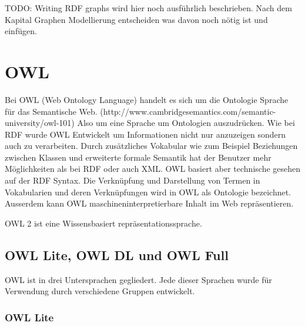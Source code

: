 TODO: Writing RDF graphs wird hier noch ausführlich beschrieben. Nach dem Kapital Graphen Modellierung entscheiden was davon noch nötig ist und einfügen.

\section{OWL}
\label{sec:owlRdf_owl}

Bei OWL (Web Ontology Language) handelt es sich um die Ontologie Sprache für das Semantische Web. (http://www.cambridgesemantics.com/semantic-university/owl-101) Also um eine Sprache um Ontologien auszudrücken. Wie bei RDF wurde OWL Entwickelt um Informationen nicht nur anzuzeigen sondern auch zu verarbeiten. Durch zusätzliches Vokabular wie zum Beispiel Beziehungen zwischen Klassen und erweiterte formale Semantik hat der Benutzer mehr Möglichkeiten als bei RDF oder auch XML. OWL basiert aber technische gesehen auf der RDF Syntax. Die Verknüpfung und Darstellung von Termen in Vokabularien und deren Verknüpfungen wird in OWL als Ontologie bezeichnet. Ausserdem kann OWL maschineninterpretierbare Inhalt im Web repräsentieren.  

OWL 2 ist eine Wissensbasiert repräsentationssprache. 

\subsection{OWL Lite, OWL DL und OWL Full}
\label{sec:owlRdf_owl_Untersprachen}
OWL ist in drei Untersprachen gegliedert. Jede dieser Sprachen wurde für Verwendung durch verschiedene Gruppen entwickelt.

\subsubsection{OWL Lite}
\label{sec:owlRdf_owl_Untersprachen_OWLLite}




